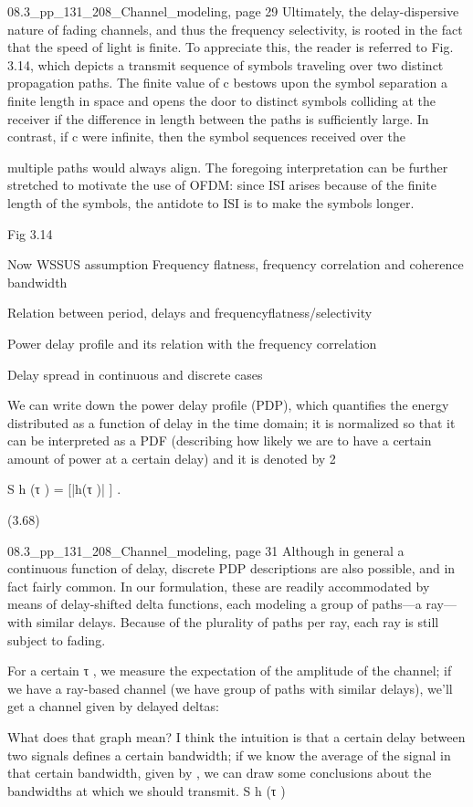 {{{{08.3_pp_131_208_Channel_modeling, page 29 Ultimately, the delay-dispersive nature of fading channels, and thus the frequency selectivity, is rooted in the fact that the speed of light is finite. To appreciate this,
the reader is referred to Fig. 3.14, which depicts a transmit sequence of symbols traveling over two distinct propagation paths. The finite value of c bestows upon the symbol separation a finite length in space and opens the door to distinct symbols colliding at the receiver if the difference in length between the paths is sufficiently large. In contrast, if c were infinite, then the symbol sequences received over the

multiple paths would always align.
The foregoing interpretation can be further stretched to motivate the use of OFDM:
since ISI arises because of the finite length of the symbols, the antidote to ISI is to make the symbols longer.

Fig 3.14

Now WSSUS assumption Frequency flatness,
frequency correlation and coherence bandwidth

Relation between period, delays and frequencyflatness/selectivity

Power delay profile and its relation with the frequency correlation

Delay spread in continuous and discrete cases

We can write down the power delay profile (PDP), which quantifies the energy distributed as a function of delay in the time domain; it is normalized so that it can be interpreted as a PDF (describing how likely we are to have a certain amount of power at a certain delay) and it is denoted by 2

S h (τ ) = [|h(τ )| ] .

(3.68)

08.3_pp_131_208_Channel_modeling, page 31 Although in general a continuous function of delay, discrete PDP descriptions are also possible, and in fact fairly common. In our formulation, these are readily accommodated by means of delay-shifted delta functions, each modeling a group of paths—a ray—with similar delays. Because of the plurality of paths per ray, each ray is still subject to fading.

For a certain τ , we measure the expectation of the amplitude of the channel; if we have a ray-based channel (we have group of paths with similar delays), we'll get a channel given by delayed deltas:

​What does that graph mean?
I think the intuition is that a certain delay between two signals defines a certain bandwidth; if we know the average of the signal in that certain bandwidth, given by
, we can draw some conclusions about the bandwidths at which we should transmit.
S h (τ )

}}}}
